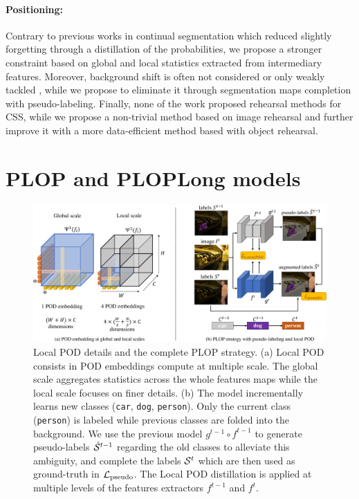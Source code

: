 \paragraph{Positioning:} Contrary to previous works in continual segmentation
\citep{michieli2019ilt,cermelli2020modelingthebackground} which reduced slightly forgetting through
a distillation of the probabilities, we propose a stronger constraint based on global and local
statistics extracted from intermediary features. Moreover, background shift is often not considered
\citep{michieli2019ilt} or only weakly tackled \citep{cermelli2020modelingthebackground}, while we
propose to eliminate it through segmentation maps completion with pseudo-labeling. Finally, none of
the work proposed rehearsal methods for \ac{CSS}, while we propose a non-trivial method based on image
rehearsal and further improve it with a more data-efficient method based with object rehearsal.


\section{PLOP and PLOPLong models}
\label{sec:seg_plop}

\begin{figure}
    \centering
    \includegraphics[width=\linewidth]{images/seg/plop_strategy.pdf}
    \caption{Local POD details and the complete PLOP strategy. (a) Local POD consists in POD
        embeddings compute at multiple scale. The global scale aggregates statistics across the
        whole features maps while the local scale focuses on finer details.  (b) The model
        incrementally learns new classes (\eg \texttt{car}, \texttt{dog},
        \texttt{person}). Only the current class (\texttt{person}) is labeled while previous classes
        are folded into the background. We use the previous model $g^{t-1} \circ f^{t-1}$ to
        generate pseudo-labels $\hat{\mathcal{S}}^{t-1}$ regarding the old classes to alleviate this
        ambiguity, and complete the labels $\mathcal{S}^t$ which are then used as ground-truth in
        $\mathcal{L}_\text{pseudo}$. The Local POD distillation is applied at multiple levels of the
        features extractors $f^{t-1}$ and $f^t$.}
    \label{fig:seg_model_plop}
\end{figure}

